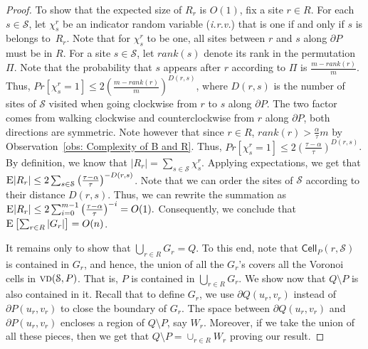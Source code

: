\documentclass[a4paper,UKenglish]{socg-lipics-v2018}
\newcommand{\s}{\mathcal S}
\newcommand{\cell}[2][P]{\ensuremath{\mathsf{Cell}_{\scriptscriptstyle #1}(#2)}}
\newcommand{\vd}[2][P]{\textsc{vd}(#2, #1)}
\newcommand{\ex}[1]{\textsc{E}\left[#1\right]}
\newcommand{\exw}[1]{\textsc{E}#1}
\begin{document}
\begin{proof}
To show that the expected size of $R_r$ is $O(1)$, fix a site $r\in R$. 
For each $s\in \s$, let $\chi^r_s$ be an indicator random variable (\emph{i.r.v.}) that is one if and only if $s$ is belongs to~$R_r$.
Note that for $\chi^r_s$ to be one, all sites between $r$ and $s$ along $\partial P$ must be in $R$.
For a site $s\in \s$, let $rank(s)$ denote its rank in the permutation $\Pi$. 
Note that the probability that $s$ appears after $r$ according to $\Pi$ is $\frac{m-rank(r)}{m}$.
Thus, $Pr[\chi^r_s = 1] \leq 2\left(\frac{m-rank(r)}{m}\right )^{D(r,s)}$, where $D(r,s)$ is the number of sites of $\s$ visited when going clockwise from $r$ to $s$ along $\partial P$. 
The two factor comes from walking clockwise and counterclockwise from $r$ along $\partial P$, both directions are symmetric.
Note however that since $r\in R$, $rank(r) > \frac{\alpha}{\tau} m$ by Observation~\ref{obs: Complexity of B and R}.
Thus, $Pr[\chi^r_s = 1] \leq 2\left(\frac{\tau - \alpha}{\tau}\right)^{D(r,s)}$.
By definition, we know that $|R_r| = \sum_{s\in \s} \chi^r_s$.
Applying expectations, we get that $\exw{|R_r|} \leq 2 \sum_{s\in \s} \left(\frac{\tau - \alpha}{\tau}\right)^{-D(r,s)}$. 
Note that we can order the sites of $\s$ according to their distance $D(r, s)$.
Thus, we can rewrite the summation as \linebreak
$\exw{ |R_r| } \leq 2 \sum_{i = 0}^{m-1} \left(\frac{\tau - \alpha}{\tau}\right)^{-i}  = O(1).$
Consequently, we conclude that $ \ex{\sum_{r\in R} |G_r|} = O(n)$.

It remains only to show that $\bigcup_{r\in R} G_r = Q$. To this end, note that $\cell{r, \s}$ is contained in $G_r$, and hence, the union of all the $G_r$'s covers all the Voronoi cells in $\vd{\s}$.
That is, $P$ is contained in $\bigcup_{r\in R} G_r$. We show now that $Q\setminus P$ is also contained in it. 
Recall that to define $G_r$, we use $\partial Q(u_r, v_r)$ instead of $\partial P(u_r, v_r)$ to close the boundary of $G_r$. The space between $\partial Q(u_r, v_r)$ and $\partial P(u_r, v_r)$ encloses a region of $Q\setminus P$, say $W_r$. Moreover, if we take the union of all these pieces, then we get that $Q\setminus P = \cup_{r\in R} W_r$ proving our result.
\end{proof}


\end{document}
